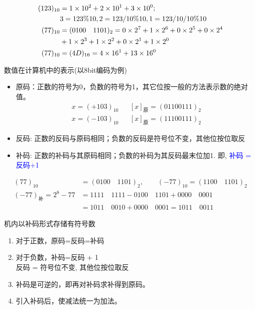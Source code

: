 \begin{frame}
\begin{example}
	\begin{align*}
	(123)_{10}&=1\times 10^2+2\times 10^1+3\times 10^0; \\
	&3=123\%10, 2=123/10\%10, 1=123/10/10\%10\\
	\newline
	(77)_{10}&=(0100\quad 1101)_{2}=0\times 2^7+1\times 2^6+0\times 2^5+0\times 2^4\\
	&+1\times 2^3+1\times 2^2+0\times 2^1+1\times 2^0\\
	\newline
	(77)_{10}&=(4D)_{16}=4\times 16^1+13\times 16^0
	\end{align*}
\end{example}
\end{frame}

\begin{frame}{数值在计算机中的表示(以8bit编码为例)}
\begin{itemize}
	\item 原码：正数的符号为0，负数的符号为1，其它位按一般的方法表示数的绝对值。
	\begin{align*}
	x=(+103)_{10}  &&[x]_{\text{原}}=(01100111)_{2}\\
	x=(-103)_{10}  &&[x]_{\text{原}}=(11100111)_{2}
	\end{align*}
	\item 反码: 正数的反码与原码相同；负数的反码是符号位不变，其他位按位取反 
	\item 补码: 正数的补码与其原码相同；负数的补码为其反码最末位加1. 即, \textcolor{blue}{补码 = 反码+1}
\end{itemize}
\begin{align*}
(77)_{10}&=(0100\quad 1101)_{2},\qquad (-77)_{10}=(1100\quad 1101)_{2}\\
(-77)_{\text{补}}=2^8-77&=1111\quad 1111 - 0100\quad 1101 +0000\quad 0001\\
	&=1011\quad 0010 + 0000\quad 0001=1011\quad 0011
\end{align*}
\end{frame}

\begin{frame}{机内以补码形式存储有符号数}
\begin{enumerate}
	\item 对于正数，原码=反码=补码
	\item 对于负数，补码=反码 + 1\\
	      反码 = 符号位不变, 其他位按位取反
	\item 补码是可逆的，即再对补码求补得到原码。
	\item 引入补码后，使减法统一为加法。	
\end{enumerate}
\end{frame}


